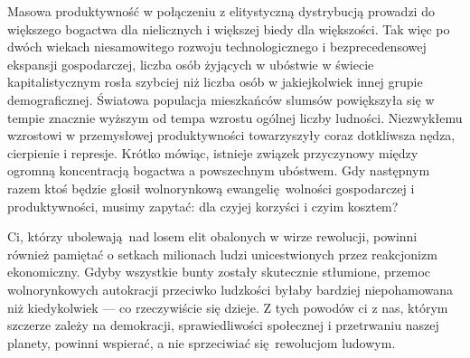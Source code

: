 \documentclass[12pt]{book}
\begin{document}
Masowa produktywność w połączeniu z elitystyczną dystrybucją prowadzi do większego bogactwa dla nielicznych i większej biedy dla większości. Tak więc po dwóch wiekach niesamowitego rozwoju technologicznego i bezprecedensowej ekspansji gospodarczej, liczba osób żyjących w ubóstwie w świecie kapitalistycznym rosła szybciej niż liczba osób w jakiejkolwiek innej grupie demograficznej. Światowa populacja mieszkańców slumsów powiększyła się w tempie znacznie wyższym od tempa wzrostu ogólnej liczby ludności. Niezwykłemu wzrostowi w przemysłowej produktywności towarzyszyły coraz dotkliwsza nędza, cierpienie i represje. Krótko mówiąc, istnieje związek przyczynowy między ogromną koncentracją bogactwa a powszechnym ubóstwem. Gdy następnym razem ktoś będzie głosił wolnorynkową ewangelię wolności gospodarczej i produktywności, musimy zapytać: dla czyjej korzyści i czyim kosztem?

Ci, którzy ubolewają nad losem elit obalonych w wirze rewolucji, powinni również pamiętać o setkach milionach ludzi unicestwionych przez reakcjonizm ekonomiczny. Gdyby wszystkie bunty zostały skutecznie stłumione, przemoc wolnorynkowych autokracji przeciwko ludzkości byłaby bardziej niepohamowana niż kiedykolwiek — co rzeczywiście się dzieje. Z tych powodów ci z nas, którym szczerze zależy na demokracji, sprawiedliwości społecznej i przetrwaniu naszej planety, powinni wspierać, a nie sprzeciwiać się rewolucjom ludowym.
\end{document}
